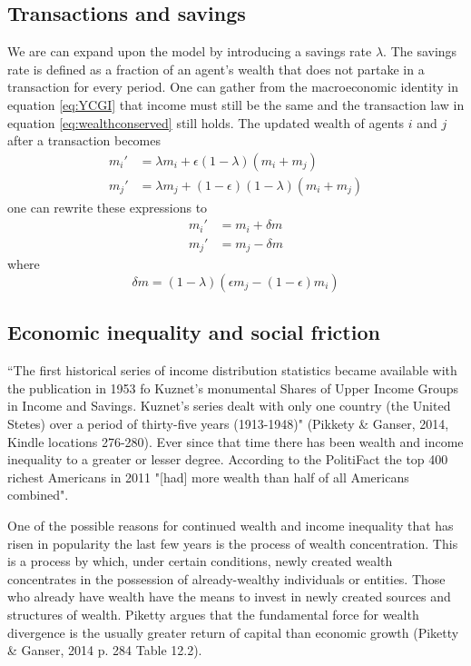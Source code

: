 \documentclass[10pt, a4paper]{amsart}
\begin{document}
\subsection{Transactions and savings}
We are can expand upon the model by introducing a savings rate $\lambda$. The savings rate is defined as a fraction of an agent's wealth that does not partake in a transaction for every period. One can gather from the macroeconomic identity in equation \ref{eq:YCGI} that income must still be the same and the transaction law in equation \ref{eq:wealthconserved} still holds. The updated wealth of agents $i$ and $j$ after a transaction becomes
\begin{align}
m_i' &= \lambda m_i + \epsilon (1 - \lambda) (m_i + m_j) \\
m_j' &= \lambda m_j + (1- \epsilon) (1 - \lambda) (m_i + m_j)
\end{align}
one can rewrite these expressions to
\begin{align*}
m_i' &= m_i + \delta m \\
m_j' &= m_j - \delta m
\end{align*}
where
\begin{equation}
\delta m = (1 - \lambda)(\epsilon m_j - (1 - \epsilon)m_i)
\end{equation}

\subsection{Economic inequality and social friction}
``The first historical series of income distribution statistics became available with the publication in 1953 fo Kuznet's monumental Shares of Upper Income Groups in Income and Savings. Kuznet's series dealt with only one country (the United Stetes) over a period of thirty-five years (1913-1948)" (Pikkety \& Ganser, 2014, Kindle locations 276-280\cite{Piketty}). Ever since that time there has been wealth and income inequality to a greater or lesser degree. According to the PolitiFact the top 400 richest Americans in 2011 "[had] more wealth than half of all Americans combined"\cite{Moore}.

One of the possible reasons for continued wealth and income inequality that has risen in popularity the last few years is the process of wealth concentration. This is a process by which, under certain conditions, newly created wealth concentrates in the possession of already-wealthy individuals or entities. Those who already have wealth have the means to invest in newly created sources and structures of wealth. Piketty argues that the fundamental force for wealth divergence is the usually greater return of capital than economic growth (Piketty \& Ganser, 2014 p. 284 Table 12.2\cite{Piketty}).
\end{document}
